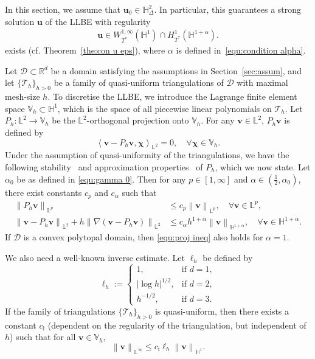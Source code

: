 \documentclass[11pt,reqno]{amsart}
\theoremstyle{definition}
\numberwithin{equation}{section}
\newcommand{\bff}{\boldsymbol}
\newcommand{\bb}{\mathbb}
\newcommand{\norm}[2]{\left\|{#1}\right\|_{#2}}
\newcommand{\inpro}[2]{\left\langle#1,#2\right\rangle}
\newcommand{\abs}[1]{\left|{#1}\right|}
\begin{document}
In this section, we assume that $\bff{u}_0 \in \bb{H}^2_\Delta$. In particular, this guarantees a strong solution $\bff{u}$ of the LLBE with regularity 
\begin{align}\label{equ:regularity llb}
	\bff{u} \in {W}^{1,\infty}_{T^\ast}(\bb{H}^1)\cap H^1_{T^\ast}(\bb{H}^{1+\alpha}).
\end{align}
exists (cf. Theorem~\ref{the:con u eps}), where $\alpha$ is defined in~\eqref{equ:condition alpha}.

Let $\mathscr{D}\subset \bb{R}^d$ be a domain satisfying the assumptions in Section~\ref{sec:assum}, and let $\{\mathcal{T}_h\}_{h>0}$ be a family of quasi-uniform triangulations of $\mathscr{D}$ with maximal mesh-size $h$. To discretise the LLBE, we introduce the Lagrange finite element space $\bb{V}_h \subset \bb{H}^1$, which is the space of all piecewise linear polynomials on $\mathcal{T}_h$. 
Let $P_h:\bb{L}^2\to \bb{V}_h$ be the {$\bb{L}^2$-orthogonal projection onto $\bb{V}_h$. For any $\bff{v}\in \bb{L}^2$, $P_h\bff{v}$ is defined} by
\begin{equation}\label{equ:orth proj}
	\inpro{\bff{v}-P_h \bff{v}}{\bff{\chi}}_{\bb{L}^2}=0, \quad \forall \bff{\chi}\in \bb{V}_h.
\end{equation}
Under the assumption of quasi-uniformity of the triangulations, we have the following stability~\citep{CroTho87} and approximation properties~\citep[Chapter~22]{ErnGue21} of $P_h$, which we now state. Let $\alpha_0$ be as defined in \eqref{equ:gamma 0}. Then for any $p\in [1,\infty]$ and $\alpha\in (\frac12,\alpha_0)$, there exist constants $c_p$ and $c_\alpha$ such that
\begin{align}
	\label{equ:proj stab}
	\norm{P_h \bff{v}}{\bb{L}^p}
	&\leq
	c_p \norm{\bff{v}}{\bb{L}^p}, \quad {\forall \bff{v}\in \bb{L}^p},
	\\
	\label{equ:proj ineq}
	\norm{\bff{v}-P_h \bff{v}}{\bb{L}^2}
	+
	h \norm{\nabla(\bff{v}- P_h \bff{v})}{\bb{L}^2}
	&\leq
	c_\alpha h^{1+\alpha} \norm{\bff{v}}{\bb{H}^{1+\alpha}}, \quad {\forall \bff{v}\in \bb{H}^{1+\alpha}}.
\end{align}
If $\mathscr{D}$ is a convex polytopal domain, then \eqref{equ:proj ineq} also holds for $\alpha=1$.

We also need a well-known inverse estimate. Let $\ell_h$ be defined by
\begin{equation}\label{equ:ell h}
	\ell_h:=
	\begin{cases}
		1, &\text{if } d=1,
		\\
		\abs{\log h}^{1/2}, &\text{if } d=2,
		\\
		h^{-1/2}, &\text{if }d=3.
	\end{cases}
\end{equation}
If the family of triangulations $\{\mathcal{T}_h\}_{h>0}$ is quasi-uniform, then there exists a constant $c_{\mathrm{i}}$ (dependent on the regularity of the triangulation, but independent of $h$) such that for all $\bff{v}\in \bb{V}_h$,
\begin{equation}\label{equ:inverse Vh}
	\norm{\bff{v}}{\bb{L}^\infty} \leq
	c_{\mathrm{i}} \ell_h \norm{\bff{v}}{\bb{H}^1}.
\end{equation}
\end{document}

